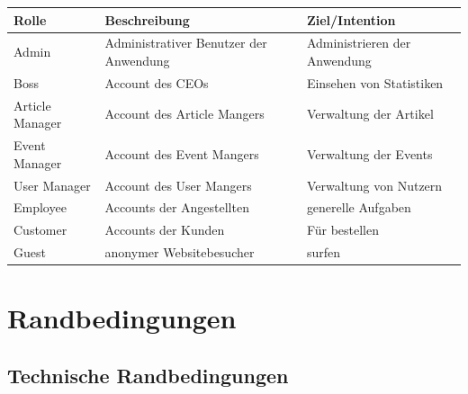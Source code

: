 \documentclass[a4paper]{article}
\begin{document}
\begin{longtable}{|l|p{125px}|p{125px}|}
	\hline
	\rowcolor[HTML]{C0C0C0}
	Rolle	& Beschreibung	& Ziel/Intention	\\ \hline
	Admin	& Administrativer Benutzer der Anwendung	& Administrieren der Anwendung	\\ \hline
	Boss	& Account des CEOs	& Einsehen von Statistiken	\\ \hline
	Article Manager	& Account des Article Mangers	& Verwaltung der Artikel	\\ \hline
	Event Manager	& Account des Event Mangers	& Verwaltung der Events	\\ \hline
	User Manager	& Account des User Mangers	& Verwaltung von Nutzern	\\ \hline
	Employee	& Accounts der Angestellten	& generelle Aufgaben	\\ \hline
	Customer	& Accounts der Kunden	& Für bestellen	\\ \hline
	Guest	& anonymer Websitebesucher	& surfen	\\ \hline
	
\end{longtable}

\newpage

\section{Randbedingungen}

\subsection{Technische Randbedingungen}
\end{document}
